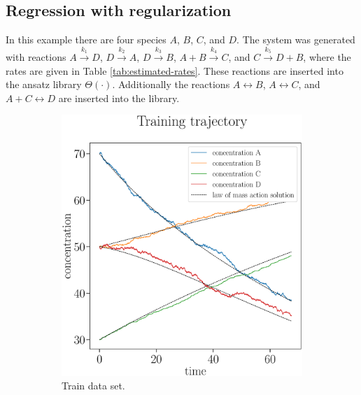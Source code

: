 \documentclass[oneside, abstracton, titlepage]{scrartcl}
\begin{document}
	\subsection{Regression with regularization}
	\label{sec:ex2}
	In this example there are four species $A$, $B$, $C$, and $D$. The system was generated with reactions $A\xrightarrow{k_1}D$, $D\xrightarrow{k_2}A$, $D\xrightarrow{k_3}B$, $A+B\xrightarrow{k_4}C$, and $C\xrightarrow{k_5}D+B$, where the rates are given in Table \ref{tab:estimated-rates}. These reactions are inserted into the ansatz library $\Theta (\cdot)$. Additionally the reactions $A\leftrightarrow B$, $A\leftrightarrow C$, and $A+C\leftrightarrow D$ are inserted into the library.
	
	\begin{figure}
		\centering
		\begin{subfigure}[b]{.45\textwidth}
			\includegraphics[width=\textwidth]{./figures_tex/cv_concentrations_train}
			\caption{Train data set.}
		\end{subfigure}
		~
		\begin{subfigure}[b]{.45\textwidth}

\end{subfigure}
\end{figure}
\end{document}
